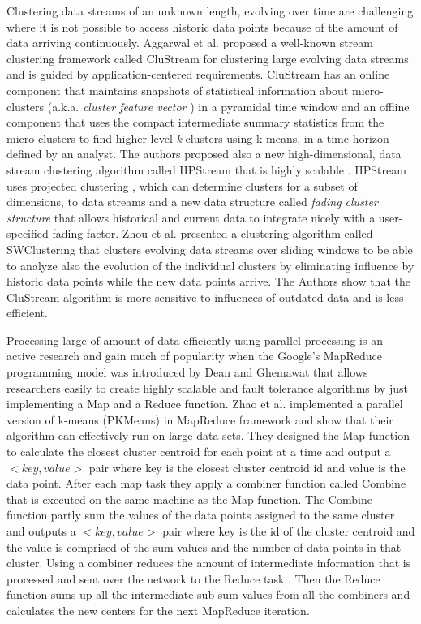 Clustering data streams of an unknown length, evolving over time \citep{Aggarwal:2002, Aggarwal:2003Evolving} are challenging where it is not possible to access historic data points because of the amount of data arriving continuously. Aggarwal et al. \citep{Aggarwal:2003} proposed a well-known stream clustering framework called CluStream for clustering large evolving data streams and is guided by application-centered requirements. CluStream has an online component that maintains snapshots of statistical information about micro-clusters (a.k.a. \textit{cluster feature vector} \citep{Zhang:1996}) in a pyramidal time window and an offline component that uses the compact intermediate summary statistics from the micro-clusters to find higher level \textit{k} clusters using k-means, in a time horizon defined by an analyst. The authors proposed also a new high-dimensional, data stream clustering algorithm called HPStream that is highly scalable \citep{Aggarwal:2004}. HPStream uses projected clustering \citep{Aggarwal:1999}, which can determine clusters for a subset of dimensions, to data streams and a new data structure called \textit{fading cluster structure} that allows historical and current data to integrate nicely with a user-specified fading factor. Zhou et al. \citep{Zhou:2008} presented a clustering algorithm called SWClustering that clusters evolving data streams over sliding windows to be able to analyze also the evolution of the individual clusters by eliminating influence by historic data points while the new data points arrive. The Authors show that the CluStream algorithm is more sensitive to influences of outdated data and is less efficient.

Processing large of amount of data efficiently using parallel processing is an active research and gain much of popularity when the Google's MapReduce programming model was introduced by Dean and Ghemawat \citep{Dean:2004} that allows researchers easily to create highly scalable and fault tolerance algorithms by just implementing a Map and a Reduce function. Zhao et al. \citep{Zhao:2009} implemented a parallel version of k-means (PKMeans) in MapReduce framework and show that their algorithm can effectively run on large data sets. They designed the Map function to calculate the closest cluster centroid for each point at a time and output a $<key, value>$ pair where key is the closest cluster centroid id and value is the data point. After each map task they apply a combiner function called Combine that is executed on the same machine as the Map function. The Combine function partly sum the values of the data points assigned to the same cluster and outputs a $<key, value>$ pair where key is the id of the cluster centroid and the value is comprised of the sum values and the number of data points in that cluster. Using a combiner reduces the amount of intermediate information that is processed and sent over the network to the Reduce task \citep{Dean:2004, Zhao:2009}. Then the Reduce function sums up all the intermediate sub sum values from all the combiners and calculates the new centers for the next MapReduce iteration. 

